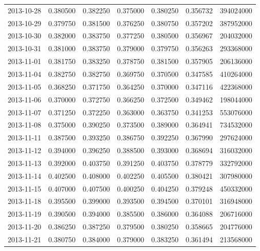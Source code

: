 \begin{tabular}{lrrrrrr}
2013-10-28 &    0.380500 &    0.382250 &    0.375000 &    0.380250 &    0.356732 &   394024000 \\
2013-10-29 &    0.379750 &    0.381500 &    0.376250 &    0.380750 &    0.357202 &   387952000 \\
2013-10-30 &    0.382000 &    0.383750 &    0.377250 &    0.380500 &    0.356967 &   204032000 \\
2013-10-31 &    0.381000 &    0.383750 &    0.379000 &    0.379750 &    0.356263 &   293368000 \\
2013-11-01 &    0.381750 &    0.383250 &    0.378750 &    0.381500 &    0.357905 &   206136000 \\
2013-11-04 &    0.382750 &    0.382750 &    0.369750 &    0.370500 &    0.347585 &   410264000 \\
2013-11-05 &    0.368250 &    0.371750 &    0.364250 &    0.370000 &    0.347116 &   422368000 \\
2013-11-06 &    0.370000 &    0.372750 &    0.366250 &    0.372500 &    0.349462 &   198044000 \\
2013-11-07 &    0.371250 &    0.372250 &    0.363000 &    0.363750 &    0.341253 &   553076000 \\
2013-11-08 &    0.375000 &    0.390250 &    0.373500 &    0.389000 &    0.364941 &   734532000 \\
2013-11-11 &    0.387500 &    0.393250 &    0.386750 &    0.392250 &    0.367990 &   297624000 \\
2013-11-12 &    0.394000 &    0.396250 &    0.388500 &    0.393000 &    0.368694 &   316032000 \\
2013-11-13 &    0.392000 &    0.403750 &    0.391250 &    0.403750 &    0.378779 &   332792000 \\
2013-11-14 &    0.402500 &    0.408000 &    0.402250 &    0.405500 &    0.380421 &   307980000 \\
2013-11-15 &    0.407000 &    0.407500 &    0.400250 &    0.404250 &    0.379248 &   450332000 \\
2013-11-18 &    0.395500 &    0.399000 &    0.393500 &    0.394500 &    0.370101 &   316948000 \\
2013-11-19 &    0.390500 &    0.394000 &    0.385500 &    0.386000 &    0.364088 &   206716000 \\
2013-11-20 &    0.386250 &    0.387250 &    0.379500 &    0.380250 &    0.358665 &   204776000 \\
2013-11-21 &    0.380750 &    0.384000 &    0.379000 &    0.383250 &    0.361494 &   213568000 \\

\end{tabular}
